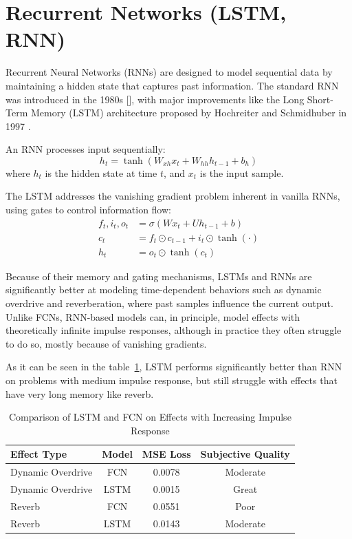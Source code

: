 \documentclass[masterthesis]{fer}
\begin{document}
\section{Recurrent Networks (LSTM, RNN)}


Recurrent Neural Networks (RNNs) are designed to model sequential data by maintaining a hidden state that captures past information. The standard RNN was introduced in the 1980s [\cite{}], with major improvements like the Long Short-Term Memory (LSTM) architecture proposed by Hochreiter and Schmidhuber in 1997 \cite{hochreiter1997long}.

An RNN processes input sequentially:
\[
h_t = \tanh(W_{xh} x_t + W_{hh} h_{t-1} + b_h)
\]
where \( h_t \) is the hidden state at time \( t \), and \( x_t \) is the input sample.

The LSTM addresses the vanishing gradient problem inherent in vanilla RNNs, using gates to control information flow:
\begin{align}
f_t, i_t, o_t &= \sigma(W x_t + U h_{t-1} + b) \\
c_t &= f_t \odot c_{t-1} + i_t \odot \tanh(\cdot) \\
h_t &= o_t \odot \tanh(c_t)
\end{align}

Because of their memory and gating mechanisms, LSTMs and RNNs are significantly better at modeling time-dependent behaviors such as dynamic overdrive and reverberation, where past samples influence the current output. Unlike FCNs, RNN-based models can, in principle, model effects with theoretically infinite impulse responses, although in practice they often struggle to do so, mostly because of vanishing gradients. 

As it can be seen in the table~\ref{tab:lstm_performance}, LSTM performs significantly better than RNN on problems with medium impulse response, but still struggle with effects that have very long memory like reverb.


\begin{table}[h]
\centering
\caption{Comparison of LSTM and FCN on Effects with Increasing Impulse Response}
\label{tab:lstm_performance}
\begin{tabular}{lccc}
\toprule
\textbf{Effect Type} & \textbf{Model} & \textbf{MSE Loss} & \textbf{Subjective Quality} \\
\midrule
Dynamic Overdrive    & FCN     & 0.0078 & Moderate \\
Dynamic Overdrive  & LSTM    & 0.0015 & Great \\
Reverb             & FCN    & 0.0551 & Poor \\
Reverb              & LSTM    & 0.0143 & Moderate \\
\bottomrule
\end{tabular}
\end{table}
\end{document}
